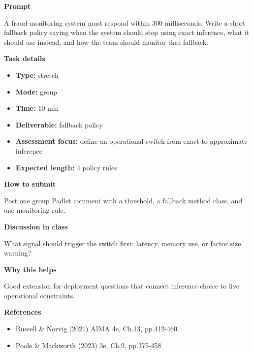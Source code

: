 \documentclass[11pt]{article}
\begin{document}
\begin{tcolorbox}[colback=white,colframe=MidnightBlue,title={Q6 Stretch Extension},fonttitle=\bfseries,breakable]
\begin{center}
\end{center}

{\large\bfseries\color{MidnightBlue} Prompt}\par\medskip
A fraud-monitoring system must respond within 300 milliseconds. Write a short fallback policy saying when the system should stop using exact inference, what it should use instead, and how the team should monitor that fallback.

{\large\bfseries\color{MidnightBlue} Task details}\par\medskip
\begin{itemize}\item \textbf{Type:} stretch
\item \textbf{Mode:} group
\item \textbf{Time:} 10 min
\item \textbf{Deliverable:} fallback policy
\item \textbf{Assessment focus:} define an operational switch from exact to approximate inference
\item \textbf{Expected length:} 4 policy rules\end{itemize}

{\large\bfseries\color{MidnightBlue} How to submit}\par\medskip
Post one group Padlet comment with a threshold, a fallback method class, and one monitoring rule.

{\large\bfseries\color{MidnightBlue} Discussion in class}\par\medskip
What signal should trigger the switch first: latency, memory use, or factor size warning?

{\large\bfseries\color{MidnightBlue} Why this helps}\par\medskip
Good extension for deployment questions that connect inference choice to live operational constraints.

{\large\bfseries\color{MidnightBlue} References}\par\medskip
\begin{itemize}\item Russell \& Norvig (2021) AIMA 4e, Ch.13, pp.412-460
\item Poole \& Mackworth (2023) 3e, Ch.9, pp.375-458\end{itemize}
\end{tcolorbox}
\end{document}

